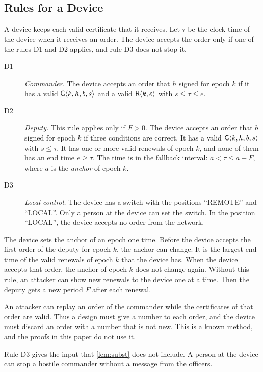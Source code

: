 \subsection{Rules for a Device}

A device keeps each valid certificate that it receives. Let $\tau$ be the clock time of the
device when it receives an order. The device accepts the order only if one of the rules D1
and D2 applies, and rule D3 does not stop it.

\begin{description}
  \item[D1] \emph{Commander.} The device accepts an order that $h$ signed for epoch $k$ if it has
  a valid $\mathsf{G}\langle k,h,b,s\rangle$ and a valid $\mathsf{R}\langle k,e\rangle$ with $s \le \tau \le e$.
  \item[D2] \emph{Deputy.} This rule applies only if $F > 0$. The device accepts an order that
  $b$ signed for epoch $k$ if three conditions are correct. It has a valid
  $\mathsf{G}\langle k,h,b,s\rangle$ with $s \le \tau$. It has one or more valid renewals of epoch $k$, and
  none of them has an end time $e \ge \tau$. The time is in the fallback interval:
  $a < \tau \le a + F$, where $a$ is the \emph{anchor} of epoch $k$.
  \item[D3] \emph{Local control.} The device has a switch with the positions ``REMOTE''
  and ``LOCAL''.
  Only a person at the device can set the switch. In the position ``LOCAL'', the device accepts
  no order from the network.
\end{description}

The device sets the anchor of an epoch one time. Before the device accepts the first order
of the deputy for epoch $k$, the anchor can change. It is the largest end time of the valid
renewals of epoch $k$ that the device has. When the device accepts that order, the anchor of epoch $k$
does not change again. Without this rule, an attacker can show new renewals to the device
one at a time. Then the deputy gets a new period $F$ after each renewal.

An attacker can replay an order of the commander while the certificates of that order are
valid. Thus a design must give a number to each order, and the device must discard an order
with a number that is not new. This is a known method, and the proofs in this paper do not
use it.

Rule D3 gives the input that \cref{lem:subst} does not include. A person at the device
can stop a hostile commander without a message from the officers. 

